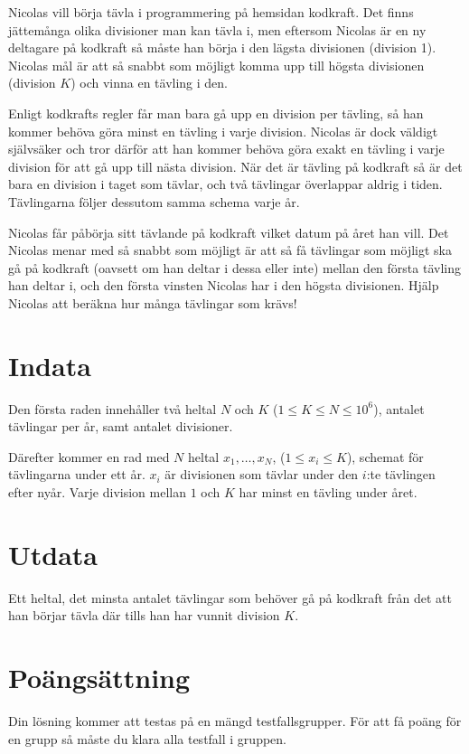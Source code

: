 \def\version{jury-2}
Nicolas vill börja tävla i programmering på hemsidan kodkraft\texttrademark.
Det finns jättemånga olika divisioner man kan tävla i, men eftersom Nicolas är en ny deltagare på kodkraft\texttrademark{} så måste han börja i den lägsta divisionen (division 1).
Nicolas mål är att så snabbt som möjligt komma upp till högsta divisionen (division $K$) och vinna en tävling i den.

Enligt kodkrafts\texttrademark{} regler får man bara gå upp en division per tävling, så han kommer behöva göra minst en tävling i varje division.
Nicolas är dock väldigt självsäker och tror därför att han kommer behöva göra exakt en tävling i varje division för att gå upp till nästa division.
När det är tävling på kodkraft\texttrademark{} så är det bara en division i taget som tävlar, och två tävlingar överlappar aldrig i tiden.
Tävlingarna följer dessutom samma schema varje år.

Nicolas får påbörja sitt tävlande på kodkraft\texttrademark{} vilket datum på året han vill.
Det Nicolas menar med så snabbt som möjligt är att så få tävlingar som möjligt ska gå på kodkraft\texttrademark{} (oavsett om han deltar i dessa eller inte) mellan den första tävling han deltar i, och den första vinsten Nicolas har i den högsta divisionen.
Hjälp Nicolas att beräkna hur många tävlingar som krävs!

\section*{Indata}
Den första raden innehåller två heltal $N$ och $K$ ($1 \leq K \leq N \leq 10^6$), antalet tävlingar per år, samt antalet divisioner.

Därefter kommer en rad med $N$ heltal $x_1, \dots, x_N$, ($1 \leq x_i \leq K$), schemat för tävlingarna under ett år.
$x_i$ är divisionen som tävlar under den $i$:te tävlingen efter nyår.
Varje division mellan $1$ och $K$ har minst en tävling under året.

\section*{Utdata}
Ett heltal, det minsta antalet tävlingar som behöver gå på kodkraft\texttrademark{} från det att han börjar tävla där tills han har vunnit division $K$.

\section*{Poängsättning}
Din lösning kommer att testas på en mängd testfallsgrupper.
För att få poäng för en grupp så måste du klara alla testfall i gruppen.


